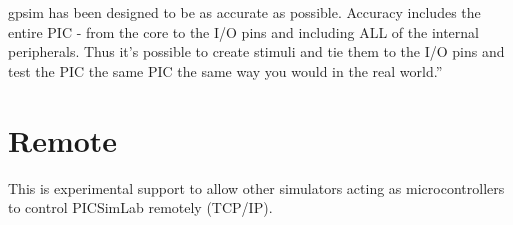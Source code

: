 gpsim has been designed to be as accurate as possible. Accuracy includes the entire PIC - from the core to the I/O pins and including ALL of the internal peripherals. Thus it's possible to create stimuli and tie them to the I/O pins and test the PIC the same PIC the same way you would in the real world.'' 
  
  
\section{Remote} \hypertarget{def:remote}{}

This is experimental support to allow other simulators acting as microcontrollers to control PICSimLab remotely (TCP/IP).
